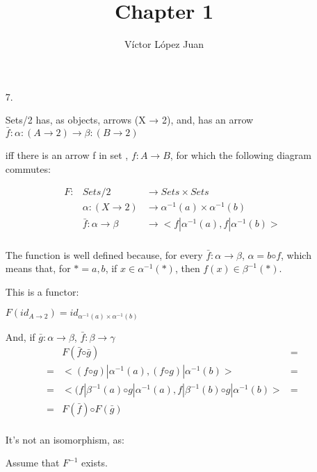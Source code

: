 \documentclass{article}
\author{Víctor López Juan}
\title{Chapter 1}
\begin{document}
\begin{enumerate}
  \item[7.]

    Sets/2 has, as objects, arrows (X → 2), and, has
    an arrow $\bar{f} : α : (A → 2) → β : (B → 2)$

    iff there is an arrow f in set , $f : A → B$, for which the following
    diagram commutes:


    \begin{equation}
    \begin{array}{rll}
      F : & Sets/2           & → Sets × Sets              \\
          & α : (X → 2)      & → α^{-1}(a) × α^{-1}(b)      \\
          & \bar{f} : α → β  & → <f|α^{-1}(a), f|α^{-1}(b)>  \\
    \end{array}
    \end{equation}

    The function is well defined because, for every $\bar{f} : α → β$,
    $α = b ◦ f$, which means that, for $* = a,b$, if
    $x ∈ α^{-1}(*)$, then $f(x) ∈ β^{-1}(*)$.

    This is a functor:

    $F(id_{A→2}) = id_{α^{-1}(a)×α^{-1}(b)}$

    And, if $\bar{g} : α → β$, $\bar{f} : β → γ$
    \begin{equation}
    \begin{array}{rcl}
       & F(\bar{f} ◦ \bar{g})                        & = \\
    =  & <(f ◦ g)|α^{-1}(a), (f ◦ g)|α^{-1}(b)>        & = \\
    =  & <(f|β^{-1}(a) ◦ g|α^{-1}(a), f|β^{-1}(b) ◦ g|α^{-1}(b)> & = \\
    =  & F(\bar{f}) ◦ F(\bar{g}) & \\ 
    \end{array}
    \end{equation}

    It's not an isomorphism, as:

    Assume that $F^{-1}$ exists.


\end{enumerate}
\end{document}
